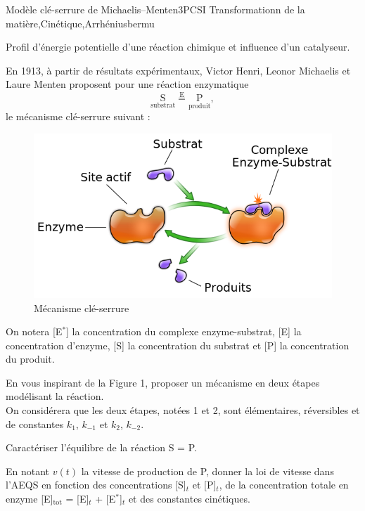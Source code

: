
\begin{exercise}{Modèle clé-serrure de Michaelis--Menten}{3}{PCSI}
{Transformationn de la matière,Cinétique,Arrhénius}{bermu}

\begin{questions}
\questioncours Profil d'énergie potentielle d'une réaction chimique et influence d'un catalyseur.

\begin{EnvUplevel}
     En 1913, à partir de résultats expérimentaux, Victor Henri, Leonor Michaelis et Laure Menten proposent pour une réaction enzymatique
     $$\mathrm{\underset{\text{substrat}}{S} \overset{E}{=} \underset{\text{produit}}{P}},$$
     le mécanisme clé-serrure suivant :
     \begin{figure}[H]
         \centering
         \includegraphics[width=0.6\linewidth]{chimie/cinetique/cinetique.png}
         \caption{Mécanisme clé-serrure}
         \label{fig:my_label}
     \end{figure}
     
     On notera [E$^\ast$] la concentration du complexe enzyme-substrat, [E] la concentration d'enzyme, [S] la concentration du substrat et [P] la concentration du produit.
     
\end{EnvUplevel}

\question En vous inspirant de la Figure 1, proposer un mécanisme en deux étapes modélisant la réaction. \\ On considérera que les deux étapes, notées 1 et 2, sont élémentaires, réversibles et de constantes $k_1$, $k_{-1}$ et $k_2$, $k_{-2}$.
    
\question Caractériser l'équilibre de la réaction S = P.

\question En notant $v(t)$ la vitesse de production de P, donner la loi de vitesse dans l'AEQS en fonction des concentrations [S]$_t$ et [P]$_t$, de la concentration totale en enzyme [E]$_\text{tot}$ = [E]$_t$ + [E$^\ast$]$_t$ et des constantes cinétiques.


\end{questions}
\end{exercise}
